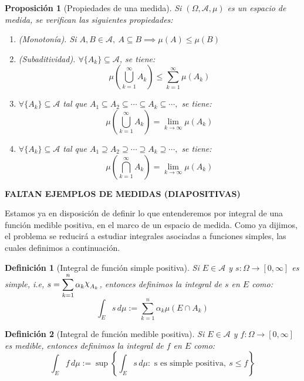 \documentclass[11pt, a4paper]{article}
\DeclareRobustCommand{\rchi}{{\mathpalette\irchi\relax}}
\newcommand{\irchi}[2]{\raisebox{\depth}{$#1\chi$}} %
\theoremstyle{theorem-style}
\newtheorem{nprop}{Proposición}[section]
\theoremstyle{definition-style}
\newtheorem{ndef}{Definición}[section]
\theoremstyle{remark-style}
\theoremstyle{example-style}
\newenvironment{nlist}
{\begin{enumerate}
    \renewcommand\labelenumi{(\emph{\roman{enumi})}}}
  {\end{enumerate}}
\begin{document}
\begin{nprop}[Propiedades de una medida] Si $(\Omega, \mathcal A, \mu)$ es un espacio de medida, se verifican las siguientes propiedades:
  \begin{nlist}
  \item (Monotonía). Si $A,B \in \mathcal{A},\ A \subseteq B \implies \mu(A) \leq \mu(B)$
  \item (Subaditividad). $\forall \{A_k\} \subseteq \mathcal{A}$, se tiene:
    \[
      \mu\left( \bigcup_{k=1}^\infty A_k \right) \leq \sum_{k=1}^\infty \mu(A_k)
    \]
  \item $\forall \{A_k\} \subseteq \mathcal{A}$ tal que $A_1\subseteq A_2\subseteq \cdots \subseteq A_k \subseteq \cdots,$ se tiene:
    $$\mu \left( \bigcup_{k=1}^\infty A_k \right) = \lim_{k \to \infty}\mu(A_k)$$
  \item $\forall \{A_k\} \subseteq \mathcal{A}$ tal que $A_1\supseteq A_2\supseteq \cdots \supseteq A_k \supseteq \cdots,$ se tiene:
    $$\mu \left( \bigcap_{k=1}^\infty A_k \right) = \lim_{k \to \infty}\mu(A_k)$$
  \end{nlist}

\end{nprop}

\textbf{FALTAN EJEMPLOS DE MEDIDAS (DIAPOSITIVAS)}

Estamos ya en disposición de definir lo que entenderemos por integral de una función medible positiva, en el marco de un espacio de medida. Como ya dijimos, el problema se reducirá a estudiar integrales asociadas a funciones simples, las cuales definimos a continuación.

\begin{ndef}[Integral de función simple positiva]
  Si $E \in \mathcal{A}$ y $s:\Omega \to [0,\infty]$ es simple, i.e, $\displaystyle s= \sum_{k=1}^n \alpha_k \rchi_{A_k}$, entonces definimos la integral de $s$ en $E$ como: 
  \[
    \int_E s\, d\mu := \sum_{k=1}^n \alpha_k \mu(E\cap A_k)
  \]
\end{ndef}


\begin{ndef}[Integral de función medible positiva]
  Si $E\in \mathcal{A}$ y $f: \Omega \to [0,\infty]$ es medible, entonces definimos la integral de $f$ en $E$ como:
  \[
    \int_E f\, d\mu := \sup\left\{\int_E s\, d\mu: \text{ s es simple positiva}, \ s \leq f\right\}
  \]
\end{ndef}
\end{document}
